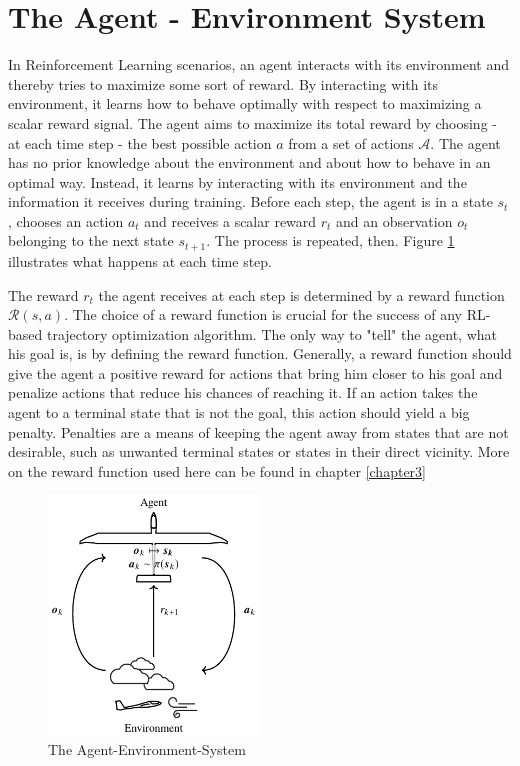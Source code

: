 \section{The Agent - Environment System}

In Reinforcement Learning scenarios, an agent interacts with its environment and thereby tries to maximize some sort of reward. By interacting with its environment, it learns how to behave optimally with respect to maximizing a scalar reward signal. The agent aims to maximize its total reward by choosing - at each time step - the best possible action $a$ from a set of actions $\mathcal{A}$. 
The agent has no prior knowledge about the environment and about how to behave in an optimal way. Instead, it learns by interacting with its environment and the information it receives during training. Before each step, the agent is in a state $s_t$, chooses an action $a_t$ and receives a scalar reward $r_t$ and an observation $o_t$ belonging to the next state $s_{t+1}$. The process is repeated, then. Figure \ref{fig:agent_env_system} illustrates what happens at each time step.

The reward $r_t$ the agent receives at each step is determined by a reward function $\mathcal{R}(s,a)$. The choice of a reward function is crucial for the success of any RL-based trajectory optimization algorithm. The only way to "tell" the agent, what his goal is, is by defining the reward function. Generally, a reward function should give the agent a positive reward for actions that bring him closer to his goal and penalize actions that reduce his chances of reaching it. If an action takes the agent to a terminal state that is not the goal, this action should yield a big penalty. Penalties are a means of keeping the agent away from states that are not desirable, such as unwanted terminal states or states in their direct vicinity. More on the reward function used here can be found in chapter \ref{chapter3} 

\begin{figure}[h]
	\centering
	\includegraphics[width=0.5\textwidth]{src/pics/RLProblem.pdf}
	\caption{The Agent-Environment-System \cite{Notter2018}}
	\label{fig:agent_env_system} 
\end{figure}

